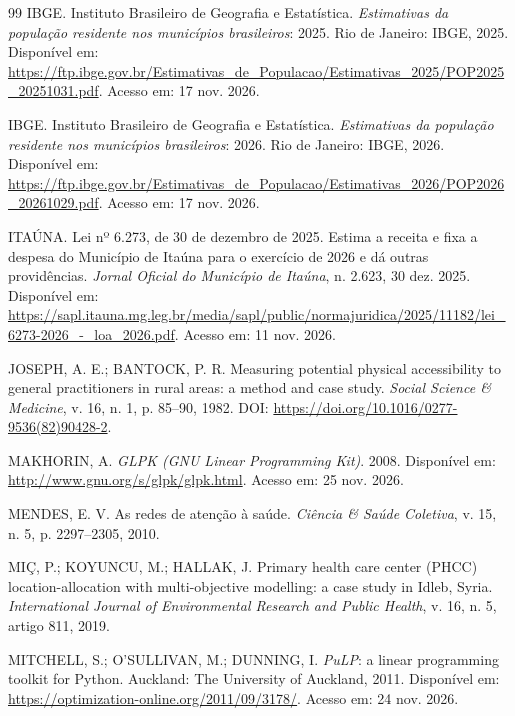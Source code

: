 \documentclass[12pt,a4paper,oneside]{report}
\begin{document}
\begin{thebibliography}{99}
IBGE. Instituto Brasileiro de Geografia e Estatística. \textit{Estimativas da população residente nos municípios brasileiros}: 2025. Rio de Janeiro: IBGE, 2025. Disponível em: \url{https://ftp.ibge.gov.br/Estimativas_de_Populacao/Estimativas_2025/POP2025_20251031.pdf}. Acesso em: 17 nov. 2026.

IBGE. Instituto Brasileiro de Geografia e Estatística. \textit{Estimativas da população residente nos municípios brasileiros}: 2026. Rio de Janeiro: IBGE, 2026. Disponível em: \url{https://ftp.ibge.gov.br/Estimativas_de_Populacao/Estimativas_2026/POP2026_20261029.pdf}. Acesso em: 17 nov. 2026.

ITAÚNA. Lei nº 6.273, de 30 de dezembro de 2025. Estima a receita e fixa a despesa do Município de Itaúna para o exercício de 2026 e dá outras providências. \textit{Jornal Oficial do Município de Itaúna}, n. 2.623, 30 dez. 2025. Disponível em: \url{https://sapl.itauna.mg.leg.br/media/sapl/public/normajuridica/2025/11182/lei_6273-2026_-_loa_2026.pdf}. Acesso em: 11 nov. 2026.

JOSEPH, A. E.; BANTOCK, P. R. Measuring potential physical accessibility to general practitioners in rural areas: a method and case study. \textit{Social Science \& Medicine}, v. 16, n. 1, p. 85--90, 1982. DOI: \url{https://doi.org/10.1016/0277-9536(82)90428-2}.

MAKHORIN, A. \textit{GLPK (GNU Linear Programming Kit)}. 2008. Disponível em: \url{http://www.gnu.org/s/glpk/glpk.html}. Acesso em: 25 nov. 2026.

MENDES, E. V. As redes de atenção à saúde. \textit{Ciência \& Saúde Coletiva}, v. 15, n. 5, p. 2297--2305, 2010.

MI\c{C}, P.; KOYUNCU, M.; HALLAK, J. Primary health care center (PHCC) location-allocation with multi-objective modelling: a case study in Idleb, Syria. \textit{International Journal of Environmental Research and Public Health}, v. 16, n. 5, artigo 811, 2019.

MITCHELL, S.; O'SULLIVAN, M.; DUNNING, I. \textit{PuLP}: a linear programming toolkit for Python. Auckland: The University of Auckland, 2011. Disponível em: \url{https://optimization-online.org/2011/09/3178/}. Acesso em: 24 nov. 2026.


\end{thebibliography}
\end{document}
